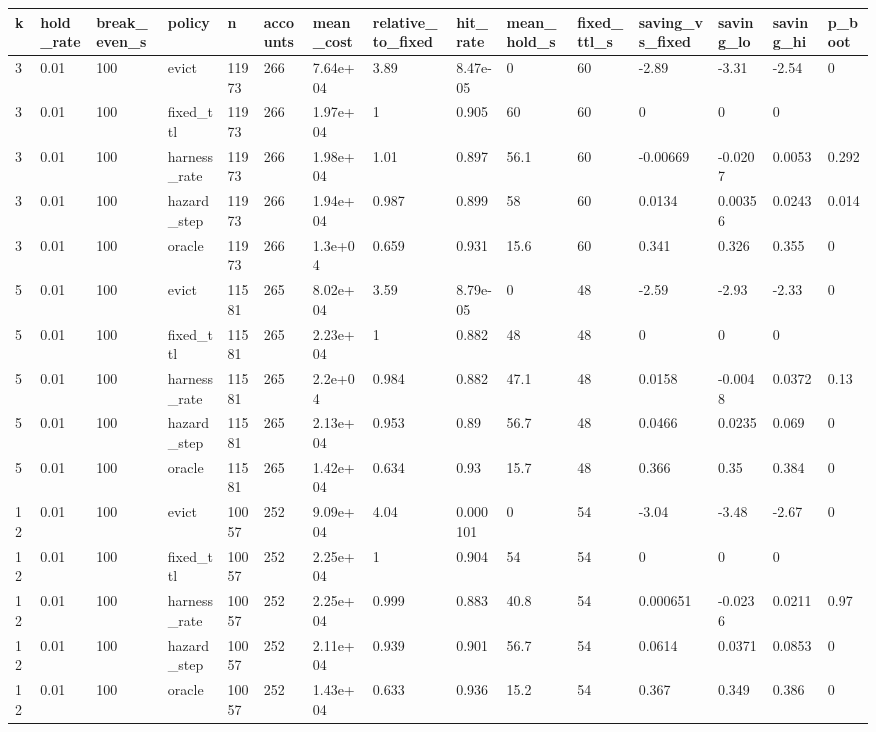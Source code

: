 \begin{tabular}{lllllllllllllll}
\toprule
k & hold\_rate & break\_even\_s & policy & n & accounts & mean\_cost & relative\_to\_fixed & hit\_rate & mean\_hold\_s & fixed\_ttl\_s & saving\_vs\_fixed & saving\_lo & saving\_hi & p\_boot \\
\midrule
3 & 0.01 & 100 & evict & 11973 & 266 & 7.64e+04 & 3.89 & 8.47e-05 & 0 & 60 & -2.89 & -3.31 & -2.54 & 0 \\
3 & 0.01 & 100 & fixed\_ttl & 11973 & 266 & 1.97e+04 & 1 & 0.905 & 60 & 60 & 0 & 0 & 0 &  \\
3 & 0.01 & 100 & harness\_rate & 11973 & 266 & 1.98e+04 & 1.01 & 0.897 & 56.1 & 60 & -0.00669 & -0.0207 & 0.0053 & 0.292 \\
3 & 0.01 & 100 & hazard\_step & 11973 & 266 & 1.94e+04 & 0.987 & 0.899 & 58 & 60 & 0.0134 & 0.00356 & 0.0243 & 0.014 \\
3 & 0.01 & 100 & oracle & 11973 & 266 & 1.3e+04 & 0.659 & 0.931 & 15.6 & 60 & 0.341 & 0.326 & 0.355 & 0 \\
5 & 0.01 & 100 & evict & 11581 & 265 & 8.02e+04 & 3.59 & 8.79e-05 & 0 & 48 & -2.59 & -2.93 & -2.33 & 0 \\
5 & 0.01 & 100 & fixed\_ttl & 11581 & 265 & 2.23e+04 & 1 & 0.882 & 48 & 48 & 0 & 0 & 0 &  \\
5 & 0.01 & 100 & harness\_rate & 11581 & 265 & 2.2e+04 & 0.984 & 0.882 & 47.1 & 48 & 0.0158 & -0.0048 & 0.0372 & 0.13 \\
5 & 0.01 & 100 & hazard\_step & 11581 & 265 & 2.13e+04 & 0.953 & 0.89 & 56.7 & 48 & 0.0466 & 0.0235 & 0.069 & 0 \\
5 & 0.01 & 100 & oracle & 11581 & 265 & 1.42e+04 & 0.634 & 0.93 & 15.7 & 48 & 0.366 & 0.35 & 0.384 & 0 \\
12 & 0.01 & 100 & evict & 10057 & 252 & 9.09e+04 & 4.04 & 0.000101 & 0 & 54 & -3.04 & -3.48 & -2.67 & 0 \\
12 & 0.01 & 100 & fixed\_ttl & 10057 & 252 & 2.25e+04 & 1 & 0.904 & 54 & 54 & 0 & 0 & 0 &  \\
12 & 0.01 & 100 & harness\_rate & 10057 & 252 & 2.25e+04 & 0.999 & 0.883 & 40.8 & 54 & 0.000651 & -0.0236 & 0.0211 & 0.97 \\
12 & 0.01 & 100 & hazard\_step & 10057 & 252 & 2.11e+04 & 0.939 & 0.901 & 56.7 & 54 & 0.0614 & 0.0371 & 0.0853 & 0 \\
12 & 0.01 & 100 & oracle & 10057 & 252 & 1.43e+04 & 0.633 & 0.936 & 15.2 & 54 & 0.367 & 0.349 & 0.386 & 0 \\
\bottomrule
\end{tabular}